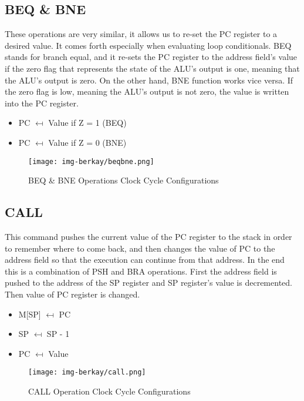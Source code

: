 \documentclass{article}
\begin{document}
\subsection{BEQ \& BNE}
These operations are very similar, it allows us to re-set the PC register to a desired value. It comes forth especially when evaluating loop conditionals. BEQ stands for branch equal, and it re-sets the PC register to the address field's value if the zero flag that represents the state of the ALU's output is one, meaning that the ALU's output is zero. On the other hand, BNE function works vice versa. If the zero flag is low, meaning the ALU's output is not zero, the value is written into the PC register.
\begin{itemize}
    \item PC $\mapsfrom$ Value if Z = 1 (BEQ)
    \item PC $\mapsfrom$ Value if Z = 0 (BNE)
\end{itemize}
\begin{figure}[h]
    \centering
    \texttt{[image: img-berkay/beqbne.png]}
    \caption{BEQ & BNE Operations Clock Cycle Configurations}
    \label{fig:my_label}
\end{figure}
\newpage
\subsection{CALL}
This command pushes the current value of the PC register to the stack in order to remember where to come back, and then changes the value of PC to the address field so that the execution can continue from that address. In the end this is a combination of PSH and BRA operations. First the address field is pushed to the address of the SP register and SP register's value is decremented. Then value of PC register is changed.
\begin{itemize}
    \item M[SP] $\mapsfrom$ PC
    \item SP $\mapsfrom$ SP - 1
    \item PC $\mapsfrom$ Value
\end{itemize}
\begin{figure}[h]
    \centering
    \texttt{[image: img-berkay/call.png]}
    \caption{CALL Operation Clock Cycle Configurations}
    \label{fig:my_label}
\end{figure}
\newpage
\end{document}
